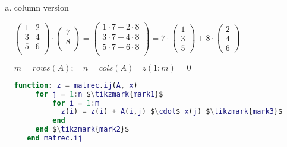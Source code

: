 \begin{frame}[fragile]
	\begin{enumerate}[b)]
		\item column version \vspace{10px}

$\left(  \begin{array}{ll} 
   1 & 2\\
   3 & 4\\
   5 & 6\\
\end{array}
\right ) \cdot 
\left ( \begin{array}{l} 
   7\\
   8\\
\end{array}
\right ) =
\left ( \begin{array}{l}
   1 \cdot 7 + 2 \cdot 8\\
   3 \cdot 7 + 4 \cdot 8\\
   5 \cdot 7 + 6 \cdot 8\\
\end{array}
\right ) = 7 \cdot
\left ( \begin{array}{l}
   1 \\
   3 \\
   5
\end{array}
\right ) + 8 \cdot
 \left ( \begin{array}{l}
   2 \\
   4 \\
   6
\end{array}
\right )
$
\vspace{10px}

$m = rows(A); \quad n = cols(A) \quad z(1:m) = 0$
\vspace{10px}
 
 \begin{lstlisting}[language=Matlab, mathescape]
  function: z = matrec.ij(A, x)
     for j = 1:n $\tikzmark{mark1}$
         for i = 1:m
	       z(i) = z(i) + A(i,j) $\cdot$ x(j) $\tikzmark{mark3}$
         end
     end $\tikzmark{mark2}$
   end matrec.ij\end{lstlisting}
\end{enumerate}
\end{frame}

